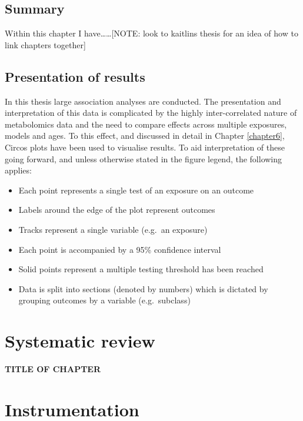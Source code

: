\documentclass[11pt,twoside]{bristolthesis}
\providecommand{\tightlist}{%
  \setlength{\itemsep}{0pt}\setlength{\parskip}{0pt}}
\begin{document}
\hypertarget{summary}{%
\section{Summary}\label{summary}}

Within this chapter I have\ldots{}\ldots{}{[}NOTE: look to kaitlins thesis for an idea of how to link chapters together{]}

\hypertarget{presentation-of-results}{%
\section{Presentation of results}\label{presentation-of-results}}

In this thesis large association analyses are conducted. The presentation and interpretation of this data is complicated by the highly inter-correlated nature of metabolomics data and the need to compare effects across multiple exposures, models and ages. To this effect, and discussed in detail in Chapter \ref{chapter6}, Circos plots have been used to visualise results. To aid interpretation of these going forward, and unless otherwise stated in the figure legend, the following applies:
\begin{itemize}
\tightlist
\item
  Each point represents a single test of an exposure on an outcome
\item
  Labels around the edge of the plot represent outcomes
\item
  Tracks represent a single variable (e.g.~an exposure)
\item
  Each point is accompanied by a 95\% confidence interval
\item
  Solid points represent a multiple testing threshold has been reached
\item
  Data is split into sections (denoted by numbers) which is dictated by grouping outcomes by a variable (e.g.~subclass)
\end{itemize}
\hypertarget{chapter2}{%
\chapter{Systematic review}\label{chapter2}}

\textbf{TITLE OF CHAPTER}

\hypertarget{chapter3}{%
\chapter{Instrumentation}\label{chapter3}}
\end{document}
